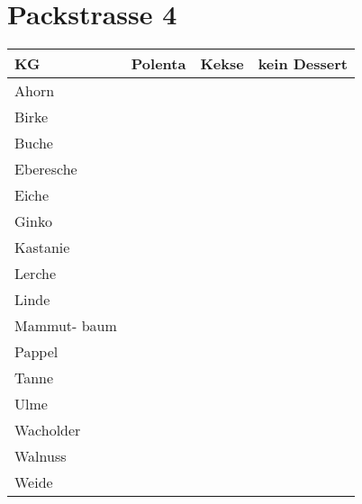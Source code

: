 \documentclass[14pt]{article}
\begin{document}
\section{Packstrasse 4}

\begin{tabular}{l|l|l|l}
  \toprule
  KG  &Polenta&Kekse&kein Dessert\\
  \midrule
Ahorn&&&\\
\midrule


Birke&&&\\
\midrule


Buche&&&\\
\midrule


Eberesche&&&\\
\midrule


Eiche&&&\\
\midrule


Ginko&&&\\
\midrule


Kastanie&&&\\
\midrule



Lerche&&&\\
\midrule


Linde&&&\\
\midrule


Mammut-
baum&&&\\
\midrule


Pappel&&&\\
\midrule


Tanne&&&\\
\midrule


Ulme&&&\\
\midrule


Wacholder&&&\\
\midrule


Walnuss&&&\\
\midrule


  Weide&&&\\
\midrule
  \bottomrule

\end{tabular}
\end{document}
